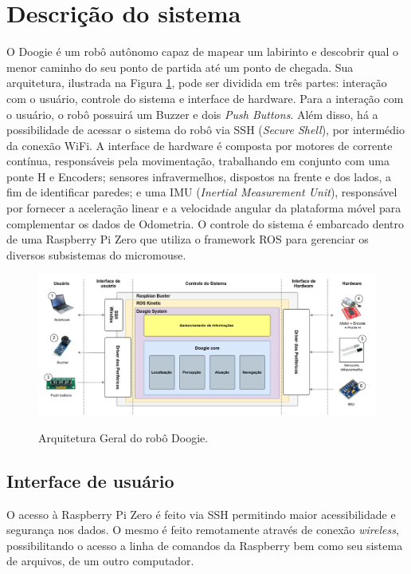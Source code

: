 \section{Descrição do sistema}
\label{sec:descricao_do_sistema}
O Doogie é um robô autônomo capaz de mapear um labirinto e descobrir qual o menor caminho do seu ponto de partida até um ponto de chegada. Sua arquitetura, ilustrada na Figura \ref{fig:arquitetura_geral}, pode ser dividida em três partes: interação com o usuário, controle do sistema e interface de hardware.
Para a interação com o usuário, o robô possuirá um Buzzer e dois \textit{Push Buttons}. Além disso, há a possibilidade de acessar o sistema do robô via SSH (\textit{Secure Shell}), por intermédio da conexão WiFi. A interface de hardware é composta por motores de corrente contínua, responsáveis pela movimentação, trabalhando em conjunto com uma ponte H e Encoders; sensores infravermelhos, dispostos na frente e dos lados, a fim de identificar paredes; e uma IMU (\textit{Inertial Measurement Unit}), responsável por fornecer a aceleração linear e a velocidade angular da plataforma móvel para complementar os dados de Odometria. O controle do sistema é embarcado dentro de uma Raspberry Pi Zero que utiliza o framework ROS para gerenciar os diversos subsistemas do micromouse.

\begin{figure}[H]
	\centering
	\caption{Arquitetura Geral do robô Doogie.}
	\includegraphics[width=1\textwidth]
	{Figures/arquitetura_geral}
	\label{fig:arquitetura_geral}
\end{figure}

\subsection{Interface de usuário}
\label{ssec:interface_de_usuario}
O acesso à Raspberry Pi Zero é feito via SSH permitindo maior acessibilidade e segurança nos dados. O mesmo é feito remotamente através de conexão \textit{wireless}, possibilitando o acesso a linha de comandos da Raspberry bem como seu sistema de arquivos, de um outro computador.
 
